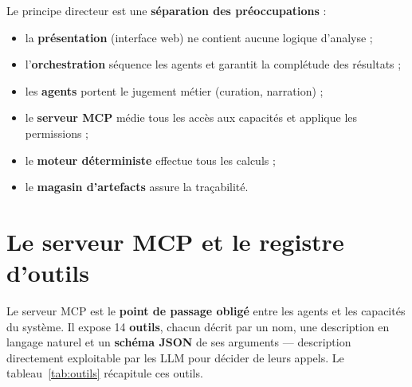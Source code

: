 Le principe directeur est une \textbf{séparation des préoccupations} :
\begin{itemize}
  \item la \textbf{présentation} (interface web) ne contient aucune logique
        d'analyse ;
  \item l'\textbf{orchestration} séquence les agents et garantit la complétude
        des résultats ;
  \item les \textbf{agents} portent le jugement métier (curation, narration) ;
  \item le \textbf{serveur MCP} médie tous les accès aux capacités et applique
        les permissions ;
  \item le \textbf{moteur déterministe} effectue tous les calculs ;
  \item le \textbf{magasin d'artefacts} assure la traçabilité.
\end{itemize}

\section{Le serveur MCP et le registre d'outils}
Le serveur MCP est le \textbf{point de passage obligé} entre les agents et les
capacités du système. Il expose 14 \textbf{outils}, chacun décrit par un nom,
une description en langage naturel et un \textbf{schéma JSON} de ses arguments
— description directement exploitable par les LLM pour décider de leurs appels.
Le tableau~\ref{tab:outils} récapitule ces outils.

